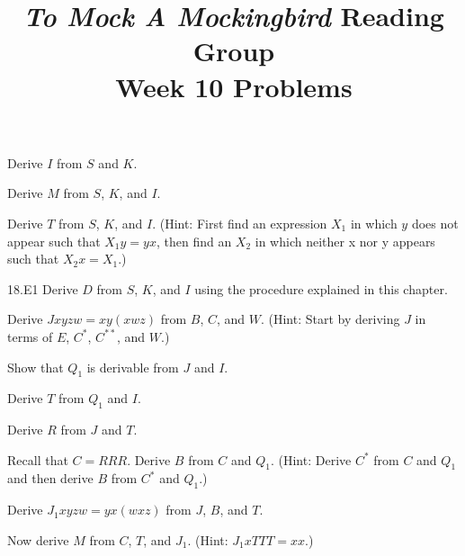 \documentclass[12pt, letterpaper]{article}
\title{\emph{To Mock A Mockingbird} Reading Group\\Week 10 Problems}
\begin{document}
\maketitle
\setcounter{section}{18}

\disclaimer

\begin{prob}{18.1}  
Derive $I$ from $S$ and $K$.
\end{prob}

\begin{prob}{18.2}  
Derive $M$ from $S$, $K$, and $I$.
\end{prob}

\begin{prob}{18.3}  
Derive $T$ from $S$, $K$, and $I$. (Hint: First find an expression $X_1$ in which $y$ does not appear such that $X_1y = yx$, then find an $X_2$ in which neither x nor y appears such that $X_2x = X_1$.)
\end{prob}

\begin{prob}{18.E1} 
Derive $D$ from $S$, $K$, and $I$ using the procedure explained in this chapter.
\end{prob}

\begin{prob}{19.1}  
Derive $Jxyzw = xy(xwz)$ from $B$, $C$, and $W$. (Hint: Start by deriving $J$ in terms of $E$, $C^*$, $C^{**}$, and $W$.)
\end{prob}

\begin{prob}{19.2}  
Show that $Q_1$ is derivable from $J$ and $I$.
\end{prob}

\begin{prob}{19.3}  
Derive $T$ from $Q_1$ and $I$.
\end{prob}

\begin{prob}{19.4}  
Derive $R$ from $J$ and $T$.
\end{prob}

\begin{prob}{19.5}  
Recall that $C = RRR$. Derive $B$ from $C$ and $Q_1$. (Hint: Derive $C^*$ from $C$ and $Q_1$ and then derive $B$ from $C^*$ and $Q_1$.)
\end{prob}

\begin{prob}{19.6}  
Derive $J_1xyzw = yx(wxz)$ from $J$, $B$, and $T$.
\end{prob}

\begin{prob}{19.7}  
Now derive $M$ from $C$, $T$, and $J_1$. (Hint: $J_1xTTT = xx$.)
\end{prob}
\end{document}
